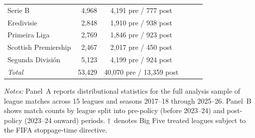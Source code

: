 \begin{table}[htbp]
\begin{threeparttable}
\begin{tabular}{lrrrrrr}
\quad Serie B & 4,968 & \multicolumn{2}{c}{4,191 pre / 777 post} & & & \\
\quad Eredivisie & 2,848 & \multicolumn{2}{c}{1,910 pre / 938 post} & & & \\
\quad Primeira Liga & 2,769 & \multicolumn{2}{c}{1,846 pre / 923 post} & & & \\
\quad Scottish Premiership & 2,467 & \multicolumn{2}{c}{2,017 pre / 450 post} & & & \\
\quad Segunda División & 5,123 & \multicolumn{2}{c}{4,199 pre / 924 post} & & & \\
\quad \textit{Total} & 53,429 & \multicolumn{2}{c}{40,070 pre / 13,359 post} & & & \\
\bottomrule
\end{tabular}
\begin{tablenotes}[flushleft]
\footnotesize
\item \textit{Notes:} Panel~A reports distributional statistics for the full analysis
sample of league matches across 15 leagues and seasons 2017--18 through 2025--26.
Panel~B shows match counts by league split into pre-policy (before 2023--24) and
post-policy (2023--24 onward) periods. $\dagger$~denotes Big Five treated leagues
subject to the FIFA stoppage-time directive.
\end{tablenotes}
\end{threeparttable}
\end{table}
